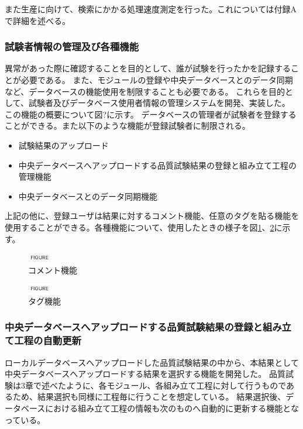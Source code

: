 また生産に向けて、検索にかかる処理速度測定を行った。これについては付録Aで詳細を述べる。

\subsubsection{試験者情報の管理及び各種機能}

異常があった際に確認することを目的として、誰が試験を行ったかを記録することが必要である。
また、モジュールの登録や中央データベースとのデータ同期など、データベースの機能使用を制限することも必要である。
これらを目的として、試験者及びデータベース使用者情報の管理システムを開発、実装した。
この機能の概要について図?に示す。
データベースの管理者が試験者を登録することができる。また以下のような機能が登録試験者に制限される。

\begin{itemize}
  \item 試験結果のアップロード
  \item 中央データベースへアップロードする品質試験結果の登録と組み立て工程の管理機能
  \item 中央データベースとのデータ同期機能
\end{itemize}

上記の他に、登録ユーザは結果に対するコメント機能、任意のタグを貼る機能を使用することができる。各種機能について、使用したときの様子を図\ref{webapp_comment}、\ref{webapp_tag}に示す。

\begin{figure}[bpt]\centering
\includegraphics[width=1cm]{figure}
\caption[コメント機能]{コメント機能}
\label{webapp_comment}
\end{figure}

\begin{figure}[bpt]\centering
\includegraphics[width=1cm]{figure}
\caption[タグ機能]{タグ機能}
\label{webapp_tag}
\end{figure}

\subsubsection{中央データベースへアップロードする品質試験結果の登録と組み立て工程の自動更新}
ローカルデータベースへアップロードした品質試験結果の中から、本結果として中央データベースへアップロードする結果を選択する機能を開発した。
品質試験は3章で述べたように、各モジュール、各組み立て工程に対して行うものであるため、結果選択も同様に工程毎に行うことを想定している。
結果選択後、データベースにおける組み立て工程の情報も次のものへ自動的に更新する機能となっている。

